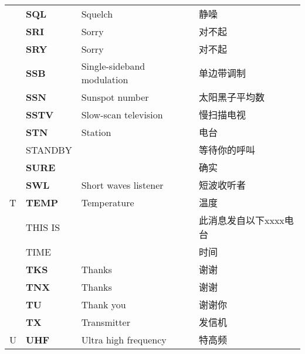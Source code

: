 \begin{longtable}[l]{llll}
    & \textbf{SQL}                      & Squelch                                 & 静噪                  \\
    & \textbf{SRI}                      & Sorry                                   & 对不起                 \\
    & \textbf{SRY}                      & Sorry                                   & 对不起                 \\
    & \textbf{SSB}                      & Single-sideband modulation              & 单边带调制               \\
    & \textbf{SSN}                      & Sunspot number                          & 太阳黑子平均数             \\
    & \textbf{SSTV}                     & Slow-scan television                    & 慢扫描电视               \\
    & \textbf{STN}                      & Station                                 & 电台                  \\
    & STANDBY                           &                                         & 等待你的呼叫              \\
    & \textbf{SURE}                     &                                         & 确实                  \\
    & \textbf{SWL}                      & Short waves listener                    & 短波收听者               \\
  T & \textbf{TEMP}                     & Temperature                             & 温度                  \\
    & THIS IS                           &                                         & 此消息发自以下xxxx电台       \\
    & TIME                              &                                         & 时间                  \\
    & \textbf{TKS}                      & Thanks                                  & 谢谢                  \\
    & \textbf{TNX}                      & Thanks                                  & 谢谢                  \\
    & \textbf{TU}                       & Thank you                               & 谢谢你                 \\
    & \textbf{TX}                       & Transmitter                             & 发信机                 \\
  U & \textbf{UHF}                      & Ultra high frequency                    & 特高频                 \\

\end{longtable}
